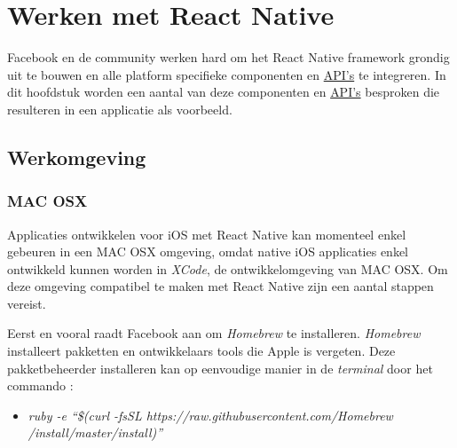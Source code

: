 \chapter{Werken met React Native} \label{chapter:workrn}
Facebook en de community werken hard om het React Native framework grondig uit te bouwen en alle platform specifieke componenten en \hyperref[api]{API's} te integreren. In dit hoofdstuk worden een aantal van deze componenten en \hyperref[api]{API's} besproken die resulteren in een applicatie als voorbeeld.  
\section{Werkomgeving}
\subsection{MAC OSX}
Applicaties ontwikkelen voor iOS met React Native kan momenteel enkel gebeuren in een MAC OSX omgeving, omdat native iOS applicaties enkel ontwikkeld kunnen worden in \emph{XCode}, de ontwikkelomgeving van MAC OSX. Om deze omgeving compatibel te maken met React Native zijn een aantal stappen vereist. 

Eerst en vooral raadt Facebook aan om \emph{Homebrew} te installeren. \emph{Homebrew} installeert pakketten en ontwikkelaars tools die Apple is vergeten. Deze pakketbeheerder installeren kan op eenvoudige manier in de \emph{terminal} door het commando : 
\begin{itemize}
	\item [] \emph{ruby -e ``\$(curl -fsSL https://raw.githubusercontent.com/Homebrew /install/master/install)''}
\end{itemize}

